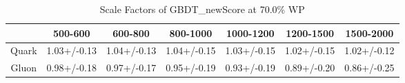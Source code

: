 \begin{table}
\centering
\caption{Scale Factors of GBDT_newScore at 70.0\% WP}
\label{tab:GBDT_newScore_0.7_Gluon}
\begin{tabular}{ccccccc}
\toprule
{} &      500-600 &      600-800 &     800-1000 &    1000-1200 &    1200-1500 &    1500-2000 \\
\midrule
Quark &  1.03+/-0.13 &  1.04+/-0.13 &  1.04+/-0.15 &  1.03+/-0.15 &  1.02+/-0.15 &  1.02+/-0.12 \\
Gluon &  0.98+/-0.18 &  0.97+/-0.17 &  0.95+/-0.19 &  0.93+/-0.19 &  0.89+/-0.20 &  0.86+/-0.25 \\
\bottomrule
\end{tabular}
\end{table}
